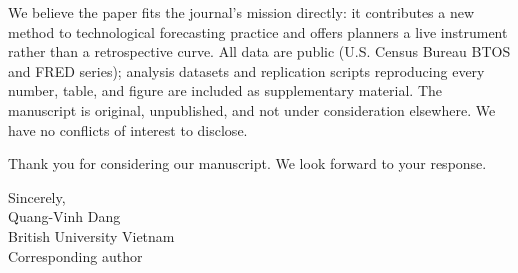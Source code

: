 \documentclass[11pt]{article}
\begin{document}
We believe the paper fits the journal's mission directly: it contributes a new method to technological forecasting practice and offers planners a live instrument rather than a retrospective curve. All data are public (U.S. Census Bureau BTOS and FRED series); analysis datasets and replication scripts reproducing every number, table, and figure are included as supplementary material. The manuscript is original, unpublished, and not under consideration elsewhere. We have no conflicts of interest to disclose.

Thank you for considering our manuscript. We look forward to your response.

\vspace{14pt}
\noindent Sincerely,\\[6pt]
Quang-Vinh Dang\\
British University Vietnam\\
Corresponding author
\end{document}
